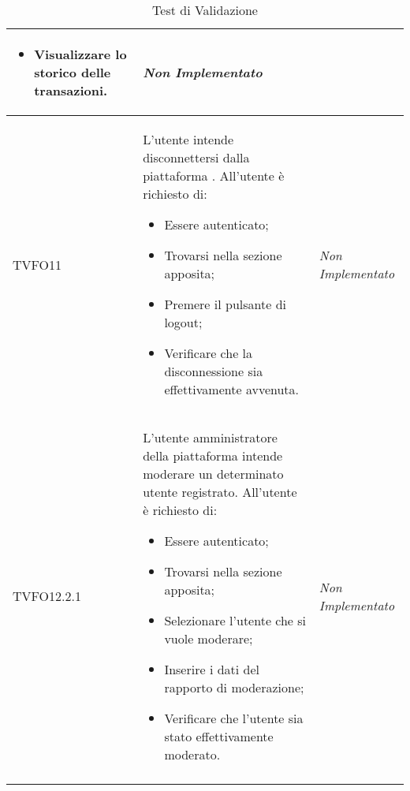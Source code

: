\begin{longtable}{|>{\centering\arraybackslash}p{2cm}|>{\centering\arraybackslash}p{7.5cm} | >{\centering\arraybackslash}p{4cm}|}
\begin{itemize}
			\item Visualizzare lo storico delle transazioni.
		\end{itemize} & \textit{Non Implementato}\\ \hline		
		\hypertarget{TVFO11}{TVFO11} & L’utente intende disconnettersi dalla piattaforma \progetto. All’utente è richiesto di:
		\begin{itemize}
			\item Essere autenticato;
			\item Trovarsi nella sezione apposita;
			\item Premere il pulsante di logout;
			\item Verificare che la disconnessione sia effettivamente avvenuta.
		\end{itemize}
		& \textit{Non Implementato}\\ \hline
		\hypertarget{TVFO12.2.1}{TVFO12.2.1} & L’utente amministratore della piattaforma \progetto intende moderare un determinato utente registrato. All’utente è richiesto di:
		\begin{itemize}
			\item Essere autenticato;
			\item Trovarsi nella sezione apposita;
			\item Selezionare l'utente che si vuole moderare;
			\item Inserire i dati del rapporto di moderazione;
			\item Verificare che l'utente sia stato effettivamente moderato.
		\end{itemize} & \textit{Non Implementato}\\ \hline
		\caption[Test di Validazione]{Test di Validazione}
		\label{tabella:test0}
	\end{longtable}
	\clearpage
	